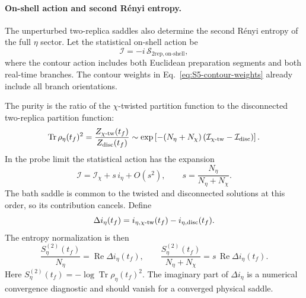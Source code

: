 \documentclass[11pt,a4paper]{article}
\begin{document}
\paragraph*{On-shell action and second R\'enyi entropy.}

The unperturbed two-replica saddles also determine the second R\'enyi entropy
of the full \(\eta\) sector. Let the statistical on-shell action be
\begin{equation}
  \mathcal I
  =
  -i\,
  \mathcal S_{\mathrm{2rep,on\mbox{-}shell}},
\label{eq:S5-statistical-action}
\end{equation}
where the contour action includes both Euclidean preparation segments and
both real-time branches. The contour weights in
Eq.~\eqref{eq:S5-contour-weights} already include all branch orientations.

The purity is the ratio of the \(\chi\)-twisted partition function to the
disconnected two-replica partition function:
\begin{equation}
  \operatorname{Tr}\rho_\eta(t_f)^2
  =
  \frac{
  Z_{\chi\text{-tw}}(t_f)
  }{
  Z_{\rm disc}(t_f)
  }
  \sim
  \exp
  \left[
  -(N_\eta+N_\chi)
  \left(
  \mathcal I_{\chi\text{-tw}}
  -
  \mathcal I_{\rm disc}
  \right)
  \right].
\label{eq:S5-purity-action-ratio}
\end{equation}
In the probe limit the statistical action has the expansion
\begin{equation}
  \mathcal I
  =
  \mathcal I_\chi
  +
  s\,i_\eta
  +
  O(s^2),
  \qquad
  s
  =
  \frac{N_\eta}{N_\eta+N_\chi}.
\label{eq:S5-probe-action-expansion}
\end{equation}
The bath saddle is common to the twisted and disconnected solutions at this
order, so its contribution cancels. Define
\begin{equation}
  \Delta i_\eta(t_f)
  =
  i_{\eta,\chi\text{-tw}}(t_f)
  -
  i_{\eta,\rm disc}(t_f).
\label{eq:S5-delta-action}
\end{equation}
The entropy normalization is then
\begin{equation}
  \frac{
  S_\eta^{(2)}(t_f)
  }{
  N_\eta
  }
  =
  \operatorname{Re}\Delta i_\eta(t_f),
  \qquad
  \frac{
  S_\eta^{(2)}(t_f)
  }{
  N_\eta+N_\chi
  }
  =
  s\,
  \operatorname{Re}\Delta i_\eta(t_f).
\label{eq:S5-entropy-normalization}
\end{equation}
Here
\(S_\eta^{(2)}(t_f)
=-\log\operatorname{Tr}\rho_\eta(t_f)^2\).
The imaginary part of \(\Delta i_\eta\) is a numerical convergence
diagnostic and should vanish for a converged physical saddle.
\end{document}
